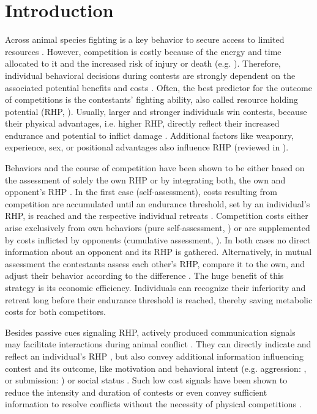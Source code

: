 \documentclass[vruler,JEB]{COB}%
\begin{document}

\section{Introduction}  %

Across animal species fighting is a key behavior to secure access to limited resources \citep{Cluttonbrock1979, Chapman1995, Markham2015}. However, competition is costly because of the energy and time allocated to it and the increased risk of injury or death (e.g. \citealp{Briffa2004}). Therefore, individual behavioral decisions during contests are strongly dependent on the associated potential benefits and costs \citep{ArnottElwood2008, ArnottElwood2009}. Often, the best predictor for the outcome of competitions is the contestants' fighting ability, also called resource holding potential (RHP, \citealp{Parker1974}). Usually, larger and stronger individuals win contests, because their physical advantages, i.e. higher RHP, directly reflect their increased endurance and potential to inflict damage \citep{Archer1988}. Additional factors like weaponry, experience, sex, or positional advantages also influence RHP (reviewed in \citealp{ArnottElwood2008}). 

Behaviors and the course of competition have been shown to be either based on the assessment of solely the own RHP or by integrating both, the own and opponent's RHP \citep{Taylor2001, Enquist1990, Huyghe2005}. In the first case (self-assessment), costs resulting from competition are accumulated until an endurance threshold, set by an individual's RHP, is reached and the respective individual retreats \citep{ArnottElwood2009}. Competition costs either arise exclusively from own behaviors (pure self-assessment, \citealp{Taylor2003}) or are supplemented by costs inflicted by opponents (cumulative assessment, \citealp{Payne1998}). In both cases no direct information about an opponent and its RHP is gathered. Alternatively, in mutual assessment the contestants assess each other's RHP, compare it to the own, and adjust their behavior according to the difference \citep{EnquistLeimar1987}. The huge benefit of this strategy is its economic efficiency. Individuals can recognize their inferiority and retreat long before their endurance threshold is reached, thereby saving metabolic costs for both competitors.

Besides passive cues signaling RHP, actively produced communication signals may facilitate interactions during animal conflict \citep{ArnottElwood2009, Seyfarth2010}. They can directly indicate and reflect an individual's RHP \citep{Davies1978, Cluttonbrock1979}, but also convey
additional information influencing contest and its outcome, like motivation and behavioral intent (e.g. aggression: \citealp{Kareklas2019, Westby1970}, or submission: \citealp{Hupe2008, Silva2012}) or social status \citep{Fernald2014}. Such low cost signals have been shown to reduce the intensity and duration of contests or even convey sufficient information to resolve conflicts without the necessity of physical competitions \citep{Parker1974, Cluttonbrock1979, Jason1990}.
\end{document}
